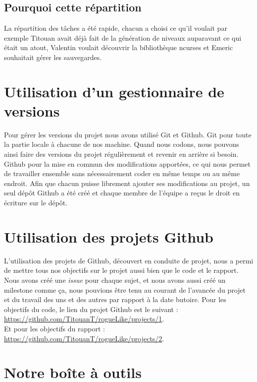 \documentclass[11pt]{report}
\begin{document}
		\subsection{Pourquoi cette répartition}
		
		La répartition des tâches a été rapide, chacun a choisi ce qu'il voulait par exemple Titouan avait déjà fait de la génération de niveaux auparavant ce qui était un atout, Valentin voulait découvrir la bibliothèque ncurses et Emeric souhaitait gérer les sauvegardes.

	\section{Utilisation d'un gestionnaire de versions}
	
		Pour gérer les versions du projet nous avons utilisé Git et Github. Git pour toute la partie locale à chacune de nos machine. Quand nous codons, nous pouvons ainsi faire des versions du projet régulièrement et revenir en arrière si besoin. Github pour la mise en commun des modifications apportées, ce qui nous permet de travailler ensemble sans nécessairement coder en même temps ou au même endroit. Afin que chacun puisse librement ajouter ses modifications au projet, un seul dépôt Github a été créé et chaque membre de l'équipe a reçus le droit en écriture sur le dépôt.
	
	\section{Utilisation des projets Github}
	
		L'utilisation des projets de Github, découvert en conduite de projet, nous a permi de mettre tous nos objectifs sur le projet aussi bien que le code et le rapport. Nous avons créé une \emph{issue} pour chaque sujet, et nous avons aussi créé un milestone comme ça, nous pouvions être tenu au courant de l'avancée du projet et du travail des uns et des autres par rapport à la date butoire.
		Pour les objectifs du code, le lien du projet Github est le suivant : \href{https://github.com/TitouanT/rogueLike/projects/1}{ https://github.com/TitouanT/rogueLike/projects/1}. \\
		Et pour les objectifs du rapport :  \href{https://github.com/TitouanT/rogueLike/projects/2} {https://github.com/TitouanT/rogueLike/projects/2}.

	\section{Notre boîte à outils} 
\end{document}
